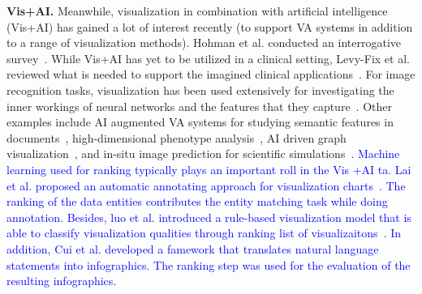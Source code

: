 

\vspace{1pt}
\noindent\textbf{Vis+AI.} Meanwhile, visualization in combination with artificial intelligence (Vis+AI) has gained a lot of interest recently (to support VA systems in addition to a range of visualization methods). Hohman et al. conducted an interrogative survey~\cite{8371286}.
While Vis+AI has yet to be utilized in a clinical setting, Levy-Fix et al. reviewed what is needed to support the imagined clinical applications~\cite{levy2019machine}. For image recognition tasks, visualization has been used extensively for investigating the inner workings of neural networks and the features that they capture~\cite{olah2017feature, 8022871, 8017583, 8827593}. Other examples include AI augmented VA systems for studying semantic features in documents~\cite{ji2019visual},  high-dimensional phenotype analysis~\cite{8827951}, AI driven graph visualization~\cite{8017580,8805452}, and in-situ image prediction for scientific simulations~\cite{he2019insitunet}. \textcolor{blue}{Machine learning used for ranking typically plays an important roll in the Vis +AI ta. Lai et al. proposed an automatic annotating approach for visualization charts~\cite{lai2020automatic}. The ranking of the data entities contributes the entity matching task while doing annotation. Besides, luo et al. introduced a rule-based visualization model that is able to classify visualization qualities through ranking list of visualizaitons~\cite{8509240}. In addition, Cui et al. developed a famework that translates natural language statements into infographics. The ranking step was used for the evaluation of the resulting infographics.}





